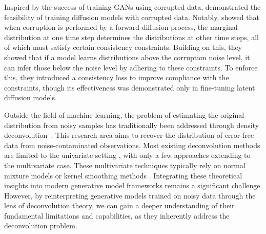 Inspired by the success of training GANs using corrupted data, \citet{DarasSDGDK2023, AaliAKT2023, DarasA2023, BaiWCS2024, DarasDD2024} demonstrated the feasibility of training diffusion models with corrupted data. Notably, \citet{DarasDD2024} showed that when corruption is performed by a forward diffusion process, the marginal distribution at one time step determines the distributions at other time steps, all of which must satisfy certain consistency constraints. Building on this, they showed that if a model learns distributions above the corruption noise level, it can infer those below the noise level by adhering to these constraints. To enforce this, they introduced a consistency loss to improve compliance with the constraints, though its effectiveness was demonstrated only in fine-tuning latent diffusion models.


Outside the field of machine learning, the problem of estimating the original distribution from noisy samples has traditionally been addressed through density deconvolution~\citep{Meister2009}. This research area aims to recover the distribution of error-free data from noise-contaminated observations. Most existing deconvolution methods are limited to the univariate setting \citep{CarrollHall88, Zhang1990, Fan91, CordyT1997, DelaigleH2008, MeisterN2010, LouniciN2011, Guan2021}, with only a few approaches extending to the multivariate case. These multivariate techniques typically rely on normal mixture models \citep{BovyHR2011, SarkarPCMC2018} or kernel smoothing methods \citep{Masry1993, LepskiW2019}. Integrating these theoretical insights into modern generative model frameworks remains a significant challenge. However, by reinterpreting generative models trained on noisy data through the lens of deconvolution theory, we can gain a deeper understanding of their fundamental limitations and capabilities, as they inherently address the deconvolution problem.
